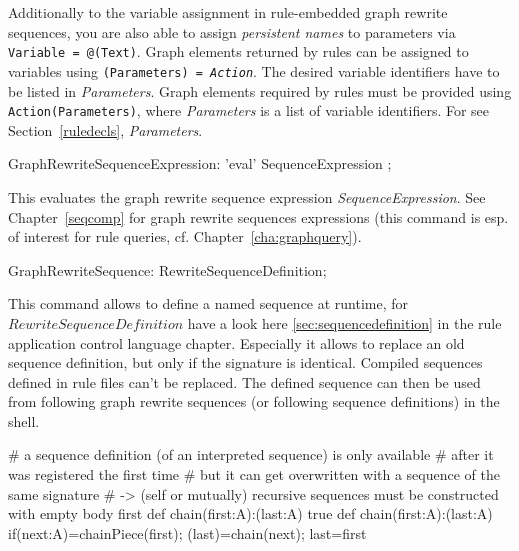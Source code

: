 Additionally to the variable assignment in rule-embedded graph rewrite sequences, you are also able to assign \emph{persistent names} to parameters via  \texttt{Variable = @(Text)}.
Graph elements returned by rules can be assigned to variables using \texttt{(Para\-meters) = \emph{Action}}.
The desired variable identifiers have to be listed in \emph{Parameters}.
Graph elements required by rules must be provided using \texttt{Action(Para\-meters)}, where \emph{Parameters} is a list of variable identifiers.
For  see Section~\ref{ruledecls}, \emph{Parameters}.

\begin{rail}
  GraphRewriteSequenceExpression: 'eval' SequenceExpression ;
\end{rail}
This evaluates the graph rewrite sequence expression \emph{SequenceExpression}.
See Chapter~\ref{seqcomp} for graph rewrite sequences expressions (this command is esp. of interest for rule queries, cf. Chapter~\ref{cha:graphquery}).

\begin{rail}
  GraphRewriteSequence: RewriteSequenceDefinition;
\end{rail}
This command allows to define a named sequence at runtime, for $RewriteSequenceDefinition$ have a look here  \ref{sec:sequencedefinition} in the rule application control language chapter.
Especially it allows to replace an old sequence definition, but only if the signature is identical.
Compiled sequences defined in rule files can't be replaced.
The defined sequence can then be used from following graph rewrite sequences (or following sequence definitions) in the shell.

\begin{example}
\begin{grgen}
# a sequence definition (of an interpreted sequence) is only available
# after it was registered the first time
# but it can get overwritten with a sequence of the same signature
# -> (self or mutually) recursive sequences must be constructed with empty body first
def chain(first:A):(last:A){ true }
def chain(first:A):(last:A){ if{(next:A)=chainPiece(first); (last)=chain(next); last=first} }
\end{grgen}
\end{example}

